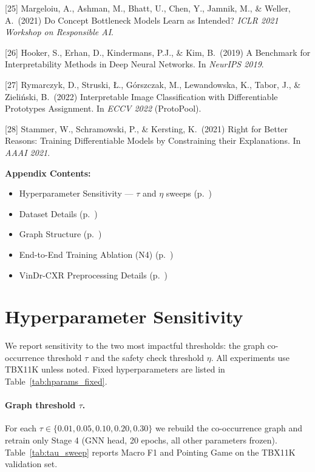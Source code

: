 \documentclass{article}
\begin{document}
{[25] Margeloiu, A., Ashman, M., Bhatt, U., Chen, Y., Jamnik, M., \& Weller, A.\ (2021) Do Concept Bottleneck Models Learn as Intended? \textit{ICLR 2021 Workshop on Responsible AI}.

[26] Hooker, S., Erhan, D., Kindermans, P.J., \& Kim, B.\ (2019) A Benchmark for Interpretability Methods in Deep Neural Networks. In \textit{NeurIPS 2019}.

[27] Rymarczyk, D., Struski, \L., G\'{o}rszczak, M., Lewandowska, K., Tabor, J., \& Zieli\'{n}ski, B.\ (2022) Interpretable Image Classification with Differentiable Prototypes Assignment. In \textit{ECCV 2022} (ProtoPool).

[28] Stammer, W., Schramowski, P., \& Kersting, K.\ (2021) Right for Better Reasons: Training Differentiable Models by Constraining their Explanations. In \textit{AAAI 2021}.

}

\appendix

\noindent\textbf{Appendix Contents:}
\begin{itemize}
  \item[\textbf{A.}] Hyperparameter Sensitivity — $\tau$ and $\eta$ sweeps (p.~\pageref{app:hparams})
  \item[\textbf{B.}] Dataset Details (p.~\pageref{app:datasets})
  \item[\textbf{C.}] Graph Structure (p.~\pageref{app:graph})
  \item[\textbf{D.}] End-to-End Training Ablation (N4) (p.~\pageref{app:n4})
  \item[\textbf{E.}] VinDr-CXR Preprocessing Details (p.~\pageref{app:vindrcxr})
\end{itemize}

\bigskip

\section{Hyperparameter Sensitivity}
\label{app:hparams}

We report sensitivity to the two most impactful thresholds: the graph co-occurrence threshold $\tau$ and the safety check threshold $\eta$.
All experiments use TBX11K unless noted.
Fixed hyperparameters are listed in Table~\ref{tab:hparams_fixed}.

\paragraph{Graph threshold $\tau$.}
For each $\tau \in \{0.01, 0.05, 0.10, 0.20, 0.30\}$ we rebuild the co-occurrence graph and retrain only Stage 4 (GNN head, 20 epochs, all other parameters frozen).
Table~\ref{tab:tau_sweep} reports Macro F1 and Pointing Game on the TBX11K validation set.
\end{document}
